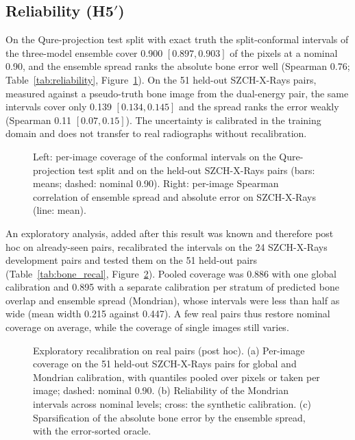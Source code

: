 \subsection{Reliability (\texorpdfstring{H5$'$}{H5'})}
On the Qure-projection test split with exact truth the split-conformal intervals of the three-model ensemble cover 0.900 $[0.897,0.903]$ of
the pixels at a nominal 0.90, and the ensemble spread ranks the absolute bone error well (Spearman 0.76; Table~\ref{tab:reliability},
Figure~\ref{fig:reliability}). On the 51 held-out SZCH-X-Rays pairs, measured against a pseudo-truth bone image from the dual-energy pair, the
same intervals cover only 0.139 $[0.134,0.145]$ and the spread ranks the error weakly (Spearman 0.11 $[0.07,0.15]$). The uncertainty is
calibrated in the training domain and does not transfer to real radiographs without recalibration.
\begin{table}[htbp]
\centering\small
\caption{Ensemble spread and split-conformal intervals ($K=3$, nominal coverage 0.90), with image-bootstrap intervals.}
\label{tab:reliability}
\end{table}
\begin{figure}[htbp]
\centering
{}
\caption{Left: per-image coverage of the conformal intervals on the Qure-projection test split and on the held-out SZCH-X-Rays pairs (bars:
means; dashed: nominal 0.90). Right: per-image Spearman correlation of ensemble spread and absolute error on SZCH-X-Rays (line: mean).}
\label{fig:reliability}
\end{figure}

An exploratory analysis, added after this result was known and therefore post hoc on already-seen pairs, recalibrated the intervals on the
24 SZCH-X-Rays development pairs and tested them on the 51 held-out pairs (Table~\ref{tab:bone_recal}, Figure~\ref{fig:bone_recal}). Pooled
coverage was 0.886 with one global calibration and 0.895 with a separate calibration per stratum of predicted bone overlap and ensemble spread
(Mondrian), whose intervals were less than half as wide (mean width 0.215 against 0.447). A few real pairs thus restore nominal coverage on
average, while the coverage of single images still varies.
\begin{table}[htbp]
\centering\small
\caption{Exploratory recalibration on real pairs (post hoc): bone-image intervals calibrated on the 24 SZCH-X-Rays development pairs and tested
on the 51 held-out pairs at nominal 0.90. Mondrian: calibration per stratum of predicted bone overlap and ensemble spread.}
\label{tab:bone_recal}
\end{table}
\begin{figure}[htbp]
\centering
{}
\caption{Exploratory recalibration on real pairs (post hoc). (a) Per-image coverage on the 51 held-out SZCH-X-Rays pairs for global and
Mondrian calibration, with quantiles pooled over pixels or taken per image; dashed: nominal 0.90. (b) Reliability of the Mondrian intervals
across nominal levels; cross: the synthetic calibration. (c) Sparsification of the absolute bone error by the ensemble spread, with the
error-sorted oracle.}
\label{fig:bone_recal}
\end{figure}
